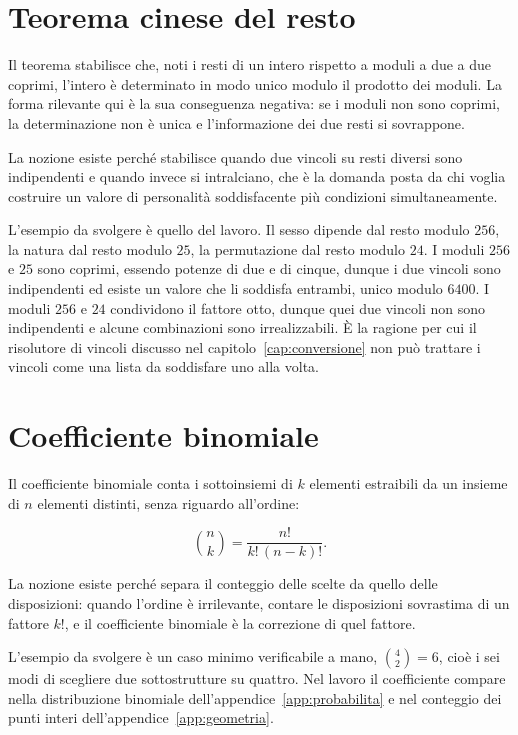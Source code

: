 \section{Teorema cinese del resto}

Il teorema stabilisce che, noti i resti di un intero rispetto a moduli a due a due coprimi, l'intero è determinato in modo unico modulo il prodotto dei moduli. La forma rilevante qui è la sua conseguenza negativa: se i moduli non sono coprimi, la determinazione non è unica e l'informazione dei due resti si sovrappone.

La nozione esiste perché stabilisce quando due vincoli su resti diversi sono indipendenti e quando invece si intralciano, che è la domanda posta da chi voglia costruire un valore di personalità soddisfacente più condizioni simultaneamente.

L'esempio da svolgere è quello del lavoro. Il sesso dipende dal resto modulo $256$, la natura dal resto modulo $25$, la permutazione dal resto modulo $24$. I moduli $256$ e $25$ sono coprimi, essendo potenze di due e di cinque, dunque i due vincoli sono indipendenti ed esiste un valore che li soddisfa entrambi, unico modulo $6400$. I moduli $256$ e $24$ condividono il fattore otto, dunque quei due vincoli non sono indipendenti e alcune combinazioni sono irrealizzabili. È la ragione per cui il risolutore di vincoli discusso nel capitolo~\ref{cap:conversione} non può trattare i vincoli come una lista da soddisfare uno alla volta.

\section{Coefficiente binomiale}

Il coefficiente binomiale conta i sottoinsiemi di $k$ elementi estraibili da un insieme di $n$ elementi distinti, senza riguardo all'ordine:

\begin{equation}
\binom{n}{k} = \frac{n!}{k!\,(n-k)!} .
\end{equation}

La nozione esiste perché separa il conteggio delle scelte da quello delle disposizioni: quando l'ordine è irrilevante, contare le disposizioni sovrastima di un fattore $k!$, e il coefficiente binomiale è la correzione di quel fattore.

L'esempio da svolgere è un caso minimo verificabile a mano, $\binom{4}{2} = 6$, cioè i sei modi di scegliere due sottostrutture su quattro. Nel lavoro il coefficiente compare nella distribuzione binomiale dell'appendice~\ref{app:probabilita} e nel conteggio dei punti interi dell'appendice~\ref{app:geometria}.

